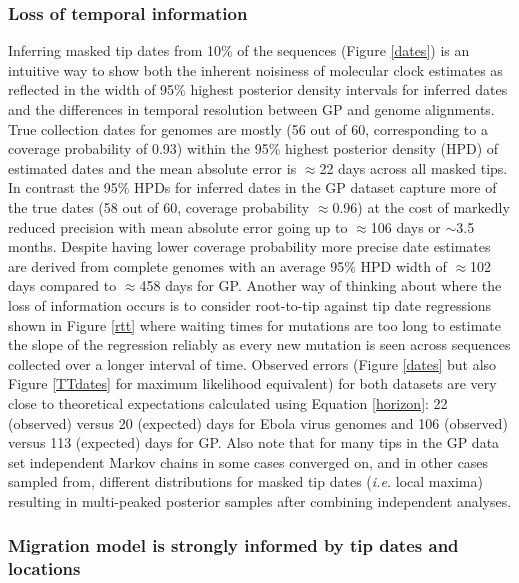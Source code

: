 \documentclass{bmcart}
\begin{document}
\subsubsection*{Loss of temporal information}


Inferring masked tip dates from 10\% of the sequences (Figure \ref{dates}) is an intuitive way to show both the inherent noisiness of molecular clock estimates as reflected in the width of 95\% highest posterior density intervals for inferred dates and the differences in temporal resolution between GP and genome alignments.
True collection dates for genomes are mostly (56 out of 60, corresponding to a coverage probability of 0.93) within the 95\% highest posterior density (HPD) of estimated dates and the mean absolute error is $\approx$22 days across all masked tips.
In contrast the 95\% HPDs for inferred dates in the GP dataset capture more of the true dates (58 out of 60, coverage probability $\approx$0.96) at the cost of markedly reduced precision with mean absolute error going up to $\approx$106 days or $\sim$3.5 months.
Despite having lower coverage probability more precise date estimates are derived from complete genomes with an average 95\% HPD width of $\approx$102 days compared to $\approx$458 days for GP.
Another way of thinking about where the loss of information occurs is to consider root-to-tip against tip date regressions shown in Figure \ref{rtt} where waiting times for mutations are too long to estimate the slope of the regression reliably as every new mutation is seen across sequences collected over a longer interval of time.
Observed errors (Figure \ref{dates} but also Figure \ref{TTdates} for maximum likelihood equivalent) for both datasets are very close to theoretical expectations calculated using Equation \ref{horizon}: 22 (observed) versus 20 (expected) days for Ebola virus genomes and 106 (observed) versus 113 (expected) days for GP.
Also note that for many tips in the GP data set independent Markov chains in some cases converged on, and in other cases sampled from, different distributions for masked tip dates (\textit{i.e.} local maxima) resulting in multi-peaked posterior samples after combining independent analyses.




\subsubsection*{Migration model is strongly informed by tip dates and locations}
\end{document}
